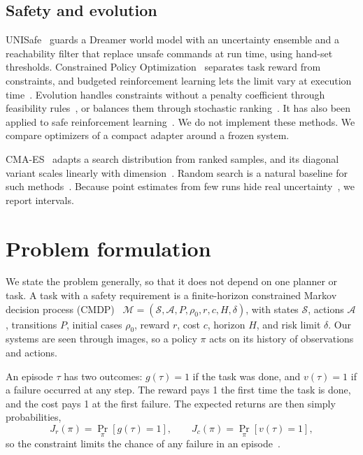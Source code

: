 \documentclass[dvipsnames,format=sigconf]{acmart}
\newcommand{\cmaes}{CMA-ES}
\begin{document}
\subsection{Safety and evolution}

UNISafe~\cite{seo2025unisafe} guards a Dreamer world model with an uncertainty ensemble and a
reachability filter that replace unsafe commands at run time, using hand-set thresholds.
Constrained Policy Optimization~\cite{achiam2017cpo} separates task reward from constraints, and
budgeted reinforcement learning lets the limit vary at execution time~\cite{carrara2019budgeted}.
Evolution handles constraints without a penalty coefficient through feasibility
rules~\cite{deb2000efficient}, or balances them through stochastic
ranking~\cite{runarsson2000stochastic}. It has also been applied to safe reinforcement
learning~\cite{belzner2021synthesizing,marchesini2022exploring}. We do not implement these methods.
We compare optimizers of a compact adapter around a frozen system.

\cmaes{}~\cite{hansen2001completely} adapts a search distribution from ranked samples, and its
diagonal variant scales linearly with dimension~\cite{ros2008simple}. Random search is a natural
baseline for such methods~\cite{bergstra2012random}. Because point estimates from few runs hide
real uncertainty~\cite{agarwal2021deep}, we report intervals.

\section{Problem formulation}
\label{sec:problem}

We state the problem generally, so that it does not depend on one planner or task. A task with
a safety requirement is a finite-horizon constrained Markov decision process
(CMDP)~\cite{altman1999constrained} $\mathcal{M}=(\mathcal{S},\mathcal{A},P,\rho_0,r,c,H,\delta)$,
with states $\mathcal{S}$, actions $\mathcal{A}$, transitions $P$, initial cases $\rho_0$, reward
$r$, cost $c$, horizon $H$, and risk limit $\delta$. Our systems are seen through images, so a
policy $\pi$ acts on its history of observations and actions.

An episode $\tau$ has two outcomes: $g(\tau)=1$ if the task was done, and $v(\tau)=1$ if a failure
occurred at any step. The reward pays 1 the first time the task is done, and the cost pays 1 at
the first failure. The expected returns are then simply probabilities,
\begin{equation}
  J_r(\pi)=\Pr_\pi[g(\tau)=1],\qquad J_c(\pi)=\Pr_\pi[v(\tau)=1],
  \label{eq:returns}
\end{equation}
so the constraint limits the chance of any failure in an episode~\cite{chen2024generalized}.
\end{document}
